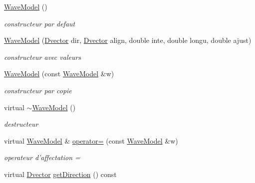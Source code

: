 \begin{DoxyCompactItemize}
\item 
\hypertarget{classWaveModel_a3bf52f16322370656b8711a68ce5d194}{\hyperlink{classWaveModel_a3bf52f16322370656b8711a68ce5d194}{Wave\-Model} ()}\label{classWaveModel_a3bf52f16322370656b8711a68ce5d194}

\begin{DoxyCompactList}\small\item\em constructeur par defaut \end{DoxyCompactList}\item 
\hypertarget{classWaveModel_afe136a278dbd88362d0b28220c70bcba}{\hyperlink{classWaveModel_afe136a278dbd88362d0b28220c70bcba}{Wave\-Model} (\hyperlink{classDvector}{Dvector} dir, \hyperlink{classDvector}{Dvector} align, double inte, double longu, double ajust)}\label{classWaveModel_afe136a278dbd88362d0b28220c70bcba}

\begin{DoxyCompactList}\small\item\em constructeur avec valeurs \end{DoxyCompactList}\item 
\hyperlink{classWaveModel_a15efb97c38955e3b5cacacf27b20e65b}{Wave\-Model} (const \hyperlink{classWaveModel}{Wave\-Model} \&w)
\begin{DoxyCompactList}\small\item\em constructeur par copie \end{DoxyCompactList}\item 
\hypertarget{classWaveModel_a83b17b2ec70b9ace55d5b3872f75dcce}{virtual \hyperlink{classWaveModel_a83b17b2ec70b9ace55d5b3872f75dcce}{$\sim$\-Wave\-Model} ()}\label{classWaveModel_a83b17b2ec70b9ace55d5b3872f75dcce}

\begin{DoxyCompactList}\small\item\em destructeur \end{DoxyCompactList}\item 
virtual \hyperlink{classWaveModel}{Wave\-Model} \& \hyperlink{classWaveModel_acbbb099975edc7b7ef03b23deb67bd68}{operator=} (const \hyperlink{classWaveModel}{Wave\-Model} \&w)
\begin{DoxyCompactList}\small\item\em operateur d'affectation = \end{DoxyCompactList}\item 
\hypertarget{classWaveModel_aaa56c92a70a69883a0d3c4da642f3d7b}{virtual \hyperlink{classDvector}{Dvector} \hyperlink{classWaveModel_aaa56c92a70a69883a0d3c4da642f3d7b}{get\-Direction} () const }\label{classWaveModel_aaa56c92a70a69883a0d3c4da642f3d7b}


\end{DoxyCompactItemize}
